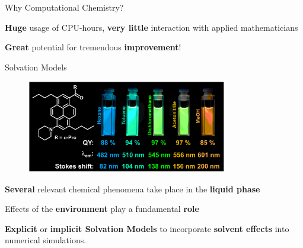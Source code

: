 \begin{frame}{Why Computational Chemistry?}
{%



\begin{wideitemize}
\item {\bf Huge} usage of CPU-hours, {\bf very little} interaction with applied mathematicians
\item {\bf Great} potential for tremendous {\bf improvement}!
\end{wideitemize}


}

\end{frame}

\begin{frame}{Solvation Models}

\begin{figure}
\begin{center}
\includegraphics[trim={0cm 0cm 0cm 0cm}, width=0.78\textwidth]{figures/page11image9000.png}
\end{center}
\end{figure}


\begin{wideitemize}
\item {\bf Several} relevant chemical phenomena take place in the {\bf liquid phase}
\item Effects of the {\bf environment} play a fundamental {\bf role}
\item {\bf \color{gray}Explicit} or {\bf implicit Solvation Models} to incorporate {\bf solvent effects} into numerical simulations.
\end{wideitemize}

\end{frame}


